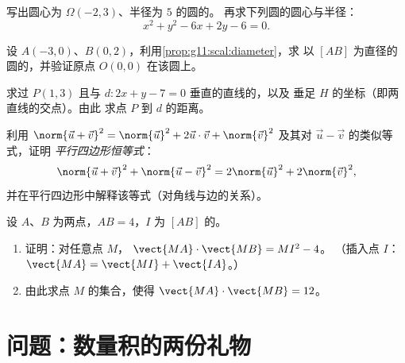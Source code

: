 \begin{exercise}[$\star\star$]\label{exo:g11:scal:7}
写出圆心为 $\Omega(-2, 3)$、半径为 $5$ 的圆的。
再求下列圆的圆心与半径：
\[
x^2 + y^2 - 6x + 2y - 6 = 0 .
\]
\end{exercise}

\begin{exercise}[$\star\star$]\label{exo:g11:scal:8}
设 $A(-3, 0)$、$B(0, 2)$，利用\cref{prop:g11:scal:diameter}，求
以 $[AB]$ 为直径的圆的，并验证原点
$O(0,0)$ 在该圆上。
\end{exercise}

\begin{exercise}[$\star\star$]\label{exo:g11:scal:9}
求过 $P(1, 3)$ 且与
$d : 2x + y - 7 = 0$ 垂直的直线的，以及
垂足 $H$ 的坐标（即两直线的交点）。由此
求点 $P$ 到 $d$ 的距离。
\end{exercise}

\begin{exercise}[$\star\star$]\label{exo:g11:scal:10}
利用 $\norm{\vec u + \vec v}^2 = \norm{\vec u}^2 + 2\vec u\cdot\vec v +
\norm{\vec v}^2$ 及其对 $\vec u - \vec v$ 的类似等式，证明
\emph{平行四边形恒等式}：
\[
\norm{\vec u + \vec v}^2 + \norm{\vec u - \vec v}^2
= 2\norm{\vec u}^2 + 2\norm{\vec v}^2 ,
\]
并在平行四边形中解释该等式（对角线与边的关系）。
\end{exercise}

\begin{exercise}[$\star\star\star$]\label{exo:g11:scal:11}
设 $A$、$B$ 为两点，$AB = 4$，$I$ 为
$[AB]$ 的。
\begin{enumerate}
  \item 证明：对任意点 $M$，
        $\vect{MA}\cdot\vect{MB} = MI^2 - 4$。
        （插入点 $I$：$\vect{MA} = \vect{MI} + \vect{IA}$。）
  \item 由此求点 $M$ 的集合，使得
        $\vect{MA}\cdot\vect{MB} = 12$。
\end{enumerate}
\end{exercise}

\section{问题：数量积的两份礼物}

